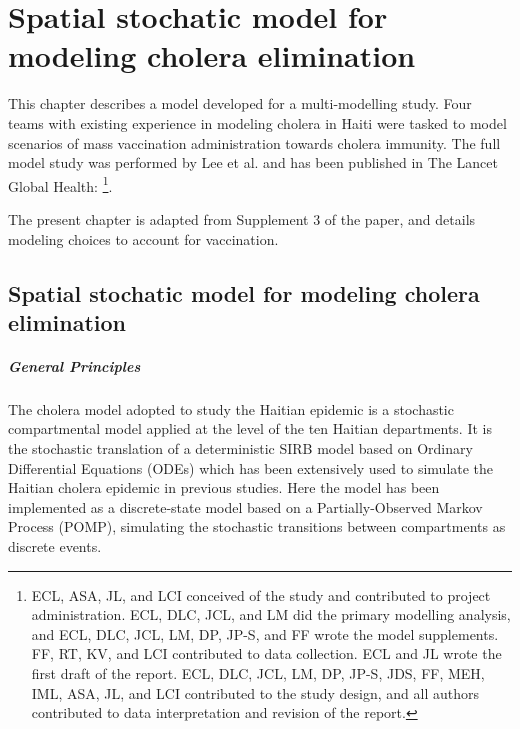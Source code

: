 \chapter{Spatial stochatic model for modeling cholera elimination}
\label{ch:cholera-haiti-ocv}

This chapter describes a model developed for a multi-modelling study. Four teams with existing experience in modeling cholera in Haiti were tasked to model scenarios of mass vaccination administration towards cholera immunity. The full model study was performed by Lee et al. and has been published in The Lancet Global Health:
\footnote{ECL, ASA, JL, and LCI conceived of the study and contributed to project administration. ECL, DLC, JCL, and LM did the primary modelling analysis, and ECL, DLC, JCL, LM, DP, JP-S, and FF wrote the model supplements. FF, RT, KV, and LCI contributed to data collection. ECL and JL wrote the first draft of the report. ECL, DLC, JCL, LM, DP, JP-S, JDS, FF, MEH, IML, ASA, JL, and LCI contributed to the study design, and all authors contributed to data interpretation and revision of the report.}. 

The present chapter is adapted from Supplement 3 of the paper, and details modeling choices to account for vaccination.

\section{Spatial stochatic model for modeling cholera elimination}
\paragraph{General Principles} The cholera model adopted to study the Haitian epidemic is a stochastic compartmental model applied at the level of the ten Haitian departments. 
It is the stochastic translation of a deterministic SIRB model based on Ordinary Differential Equations (ODEs) which has been extensively used to simulate the Haitian cholera epidemic in previous studies\cite{Rinaldo:Reassessment20102011:2012, Bertuzzo:PredictionSpatialEvolution:2011,Bertuzzo:ProbabilityExtinctionHaiti:2016,Pasetto:RealtimeForecastingCholera:2018, Lemaitre:RainfallDriverEpidemic:2019}. 
Here the model has been implemented as a discrete-state model based on a Partially-Observed Markov Process (POMP), simulating the stochastic transitions between compartments as discrete events\cite{King:InapparentInfectionsCholera:2008}.

